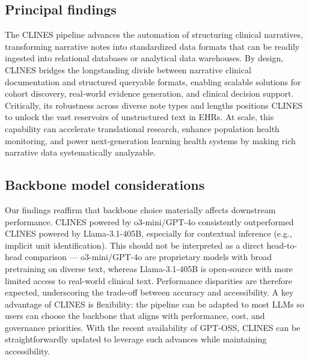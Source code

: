 \subsection{Principal findings}

The CLINES pipeline advances the automation of structuring clinical narratives, transforming narrative notes into standardized data formats that can be readily ingested into relational databases or analytical data warehouses. By design, CLINES bridges the longstanding divide between narrative clinical documentation and structured queryable formats, enabling scalable solutions for cohort discovery, real-world evidence generation, and clinical decision support. Critically, its robustness across diverse note types and lengths positions CLINES to unlock the vast reservoirs of unstructured text in EHRs. At scale, this capability can accelerate translational research, enhance population health monitoring, and power next-generation learning health systems by making rich narrative data systematically analyzable.

\subsection{Backbone model considerations}

Our findings reaffirm that backbone choice materially affects downstream performance. CLINES powered by o3-mini/GPT-4o consistently outperformed CLINES powered by Llama-3.1-405B, especially for contextual inference (e.g., implicit unit identification). This should not be interpreted as a direct head-to-head comparison --- o3-mini/GPT-4o are proprietary models with broad pretraining on diverse text, whereas Llama-3.1-405B is open-source with more limited access to real-world clinical text. Performance disparities are therefore expected, underscoring the trade-off between accuracy and accessibility.  A key advantage of CLINES is flexibility: the pipeline can be adapted to most LLMs so users can choose the backbone that aligns with performance, cost, and governance priorities. With the recent availability of GPT-OSS, CLINES can be straightforwardly updated to leverage such advances while maintaining accessibility.

